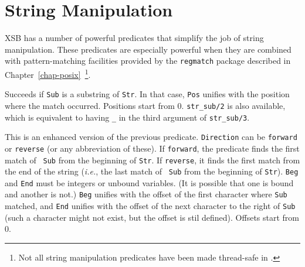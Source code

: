 
\section{String Manipulation}
\label{sec-strings}

XSB has a number of powerful predicates that simplify the job of
string manipulation. These predicates are especially powerful when
they are combined with pattern-matching facilities provided by the
{\tt regmatch} package described in
Chapter~\ref{chap-posix}~\footnote{Not all string
  manipulation predicates have been made thread-safe in \version{}.}.

\begin{description}

Succeeds if {\tt Sub} is a substring of {\tt Str}. In that case, {\tt Pos}
unifies with the position where the match occurred. Positions start
from 0. {\tt str\_sub/2} is also available, which is equivalent
to having {\tt \_} in the third argument of {\tt str\_sub/3}.


This is an enhanced version of the previous predicate.
{\tt Direction} can be {\tt forward} or {\tt reverse} (or any abbreviation
of these). If {\tt forward}, the predicate finds the first match of {\tt
  Sub} from the beginning of {\tt Str}. If {\tt reverse}, it finds the
first match from the end of the string ({\it i.e.}, the last match of {\tt
  Sub} from the beginning of {\tt Str}). {\tt Beg} and {\tt End} must be
integers or unbound variables. (It is possible that one is bound and
another is not.)
{\tt Beg} unifies with the offset of the first character where {\tt Sub}
matched, and {\tt End} unifies with the offset of the next character to the
right of {\tt Sub} (such a character might not exist, but the offset is
stil defined). Offsets start from 0.


\end{description}
